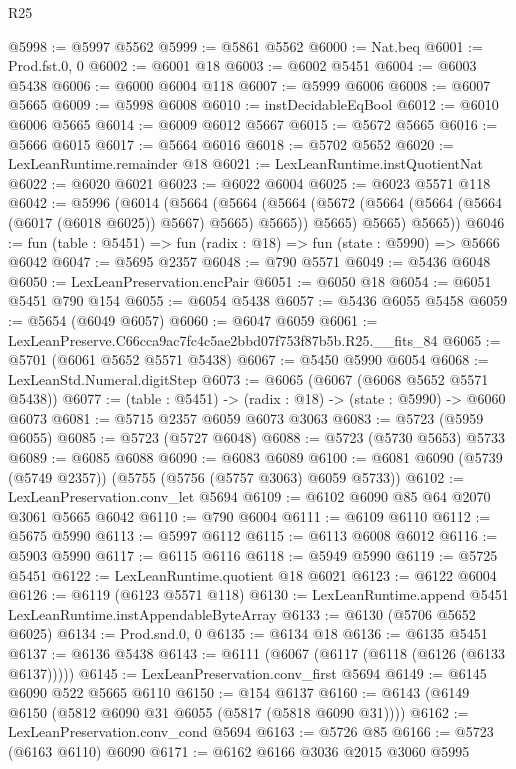 \begin{lexlean}{R25}
\begin{coremodule}
@5998 := @5997 @5562
@5999 := @5861 @5562
@6000 := Nat.beq
@6001 := Prod.fst.{0, 0}
@6002 := @6001 @18
@6003 := @6002 @5451
@6004 := @6003 @5438
@6006 := @6000 @6004 @118
@6007 := @5999 @6006
@6008 := @6007 @5665
@6009 := @5998 @6008
@6010 := instDecidableEqBool
@6012 := @6010 @6006 @5665
@6014 := @6009 @6012 @5667
@6015 := @5672 @5665
@6016 := @5666 @6015
@6017 := @5664 @6016
@6018 := @5702 @5652
@6020 := LexLeanRuntime.remainder @18
@6021 := LexLeanRuntime.instQuotientNat
@6022 := @6020 @6021
@6023 := @6022 @6004
@6025 := @6023 @5571 @118
@6042 := @5996
    (@6014
      (@5664
        (@5664
          (@5664 (@5672 (@5664 (@5664 (@5664 (@6017 (@6018 @6025)) @5667) @5665) @5665)) @5665)
          @5665)
        @5665))
@6046 := fun (table : @5451) => fun (radix : @18) => fun (state : @5990) => @5666 @6042
@6047 := @5695 @2357
@6048 := @790 @5571
@6049 := @5436 @6048
@6050 := LexLeanPreservation.encPair
@6051 := @6050 @18
@6054 := @6051 @5451 @790 @154
@6055 := @6054 @5438
@6057 := @5436 @6055 @5458
@6059 := @5654 (@6049 @6057)
@6060 := @6047 @6059
@6061 := LexLeanPreserve.C66cca9ac7fc4c5ae2bbd07f753f87b5b.R25.__fits_84
@6065 := @5701 (@6061 @5652 @5571 @5438)
@6067 := @5450 @5990 @6054
@6068 := LexLeanStd.Numeral.digitStep
@6073 := @6065 (@6067 (@6068 @5652 @5571 @5438))
@6077 := (table : @5451) -> (radix : @18) -> (state : @5990) -> @6060 @6073
@6081 := @5715 @2357 @6059 @6073 @3063
@6083 := @5723 (@5959 @6055)
@6085 := @5723 (@5727 @6048)
@6088 := @5723 (@5730 @5653) @5733
@6089 := @6085 @6088
@6090 := @6083 @6089
@6100 := @6081 @6090 (@5739 (@5749 @2357)) (@5755 (@5756 (@5757 @3063) @6059 @5733))
@6102 := LexLeanPreservation.conv_let @5694
@6109 := @6102 @6090 @85 @64 @2070 @3061 @5665 @6042
@6110 := @790 @6004
@6111 := @6109 @6110
@6112 := @5675 @5990
@6113 := @5997 @6112
@6115 := @6113 @6008 @6012
@6116 := @5903 @5990
@6117 := @6115 @6116
@6118 := @5949 @5990
@6119 := @5725 @5451
@6122 := LexLeanRuntime.quotient @18 @6021
@6123 := @6122 @6004
@6126 := @6119 (@6123 @5571 @118)
@6130 := LexLeanRuntime.append @5451 LexLeanRuntime.instAppendableByteArray
@6133 := @6130 (@5706 @5652 @6025)
@6134 := Prod.snd.{0, 0}
@6135 := @6134 @18
@6136 := @6135 @5451
@6137 := @6136 @5438
@6143 := @6111 (@6067 (@6117 (@6118 (@6126 (@6133 @6137)))))
@6145 := LexLeanPreservation.conv_first @5694
@6149 := @6145 @6090 @522 @5665 @6110
@6150 := @154 @6137
@6160 := @6143 (@6149 @6150 (@5812 @6090 @31 @6055 (@5817 (@5818 @6090 @31))))
@6162 := LexLeanPreservation.conv_cond @5694
@6163 := @5726 @85
@6166 := @5723 (@6163 @6110) @6090
@6171 := @6162 @6166 @3036 @2015 @3060 @5995

\end{coremodule}
\end{lexlean}
